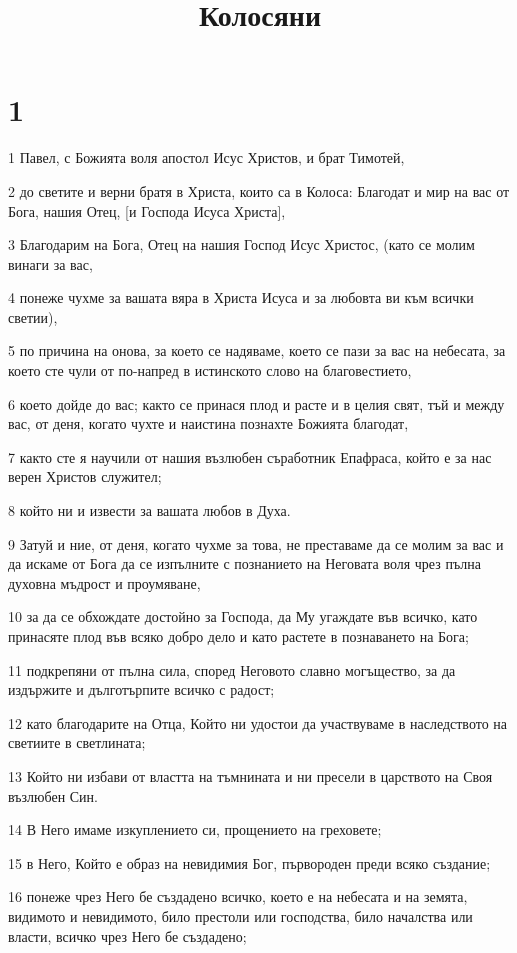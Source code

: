 

\title{Колосяни}


\chapter{1}

\par 1 Павел, с Божията воля апостол Исус Христов, и брат Тимотей,
\par 2 до светите и верни братя в Христа, които са в Колоса: Благодат и мир на вас от Бога, нашия Отец, [и Господа Исуса Христа],
\par 3 Благодарим на Бога, Отец на нашия Господ Исус Христос, (като се молим винаги за вас,
\par 4 понеже чухме за вашата вяра в Христа Исуса и за любовта ви към всички светии),
\par 5 по причина на онова, за което се надяваме, което се пази за вас на небесата, за което сте чули от по-напред в истинското слово на благовестието,
\par 6 което дойде до вас; както се принася плод и расте и в целия свят, тъй и между вас, от деня, когато чухте и наистина познахте Божията благодат,
\par 7 както сте я научили от нашия възлюбен съработник Епафраса, който е за нас верен Христов служител;
\par 8 който ни и извести за вашата любов в Духа.
\par 9 Затуй и ние, от деня, когато чухме за това, не преставаме да се молим за вас и да искаме от Бога да се изпълните с познанието на Неговата воля чрез пълна духовна мъдрост и проумяване,
\par 10 за да се обхождате достойно за Господа, да Му угаждате във всичко, като принасяте плод във всяко добро дело и като растете в познаването на Бога;
\par 11 подкрепяни от пълна сила, според Неговото славно могъщество, за да издържите и дълготърпите всичко с радост;
\par 12 като благодарите на Отца, Който ни удостои да участвуваме в наследството на светиите в светлината;
\par 13 Който ни избави от властта на тъмнината и ни пресели в царството на Своя възлюбен Син.
\par 14 В Него имаме изкуплението си, прощението на греховете;
\par 15 в Него, Който е образ на невидимия Бог, първороден преди всяко създание;
\par 16 понеже чрез Него бе създадено всичко, което е на небесата и на земята, видимото и невидимото, било престоли или господства, било началства или власти, всичко чрез Него бе създадено;
